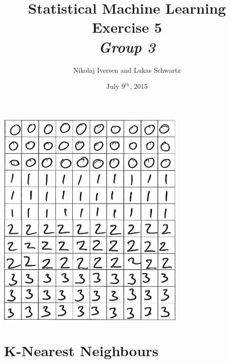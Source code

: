 \documentclass[12pt,a4paper]{article}
\begin{document}
\title{Statistical Machine Learning\\Exercise 5\\{\large\emph{Group 3}}}
\author{Nikolaj Iversen and Lukas Schwartz}
\date{July 9$^{th}$, 2015}
\maketitle

\vfill
\begin{center}
\includegraphics[width=0.7\textwidth]{graphics/digit_example}
\end{center}

\newpage

\tableofcontents
\listoffigures
\listoftables

\newpage


\section{K-Nearest Neighbours}



% 







%

%

%

\end{document}

